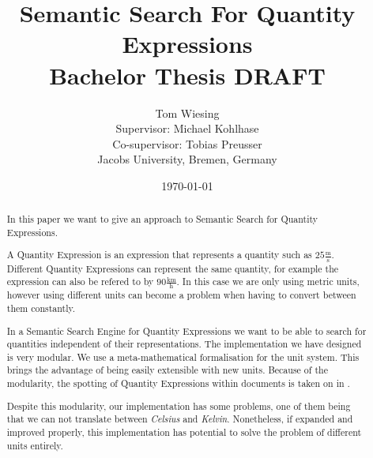 \documentclass[11pt]{article}
\title{Semantic Search For Quantity Expressions\\ \vspace{2 mm} Bachelor Thesis DRAFT\ednote{Remove draft status}}
\author{Tom Wiesing\\Supervisor: Michael Kohlhase\\Co-supervisor: Tobias Preusser\\Jacobs University, Bremen, Germany}
\date{\today}
\begin{document}
\maketitle

\begin{abstract}

  \noindent In this paper we want to give an approach to Semantic Search for Quantity Expressions.

  A Quantity Expression is an expression that represents a quantity such as $25 \frac{\text{m}}{\text{s}}$. Different Quantity Expressions can represent the same quantity, for example the expression can also be refered to by $90 \frac{\text{km}}{\text{h}}$. In this case we are only using metric units, however using different units can become a problem when having to convert between them constantly.

  In a Semantic Search Engine for Quantity Expressions we want to be able to search for quantities independent of their representations. The implementation we have designed is very modular. We use a meta-mathematical formalisation for the unit system. This brings the advantage of being easily extensible with new units. Because of the modularity, the spotting of Quantity Expressions within documents is taken on in \cite{thesis:sherko}.

  Despite this modularity, our implementation has some problems, one of them being that we can not translate between \textit{Celsius} and \textit{Kelvin}. Nonetheless, if expanded and improved properly, this implementation has potential to solve the problem of different units entirely.

\end{abstract}

\newpage

\tableofcontents

\newpage



\newpage



\newpage



\newpage



\newpage



\newpage



\newpage

{}
\end{document}
